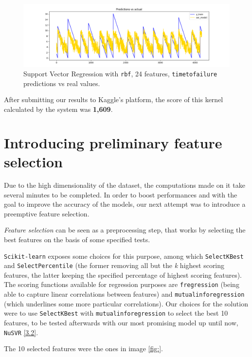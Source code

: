 \begin{figure} [h]
	\centering
	\includegraphics[width=1\linewidth]{pictures/nu_svr_24f.png}
	\caption{Support Vector Regression with \texttt{rbf}, 24 features, \texttt{time\textunderscore to\textunderscore failure} predictions vs real values.}
	\label{fig:SVR}
\end{figure}

After submitting our results to Kaggle's platform, the score of this kernel calculated by the system was \textbf{1,609}.

\section[Feature selection]{Introducing preliminary feature selection}
Due to the high dimensionality of the dataset, the computations made on it take several minutes to be completed. In order to boost performances and with the goal to improve the accuracy of the models, our next attempt was to introduce a preemptive feature selection.

\textit{Feature selection} can be seen as a preprocessing step, that works by selecting the best features on the basis of some specified tests.

\texttt{Scikit-learn} exposes some choices for this purpose, among which \texttt{SelectKBest} and \texttt{SelectPercentile} (the former removing all but the \textit{k} highest scoring features, the latter keeping the specified percentage of highest scoring features). The scoring functions available for regression purposes are \texttt{f\textunderscore regression} (being able to capture linear correlations between features) and \texttt{mutual\textunderscore info\textunderscore regression} (which underlines some more particular correlations). Our choices for the solution were to use \texttt{SelectKBest} with \texttt{mutual\textunderscore info\textunderscore regression} to select the best 10 features, to be tested afterwards with our most promising model up until now, \texttt{NuSVR} \ref{3.2}.

The 10 selected features were the ones in image \ref{fig:}.

